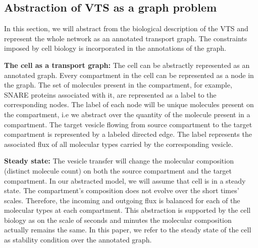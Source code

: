 \subsection{Abstraction of VTS as a graph problem}


In this section, we will abstract from the biological description of the VTS and represent the whole network as an annotated transport graph. 
%
The constraints imposed by cell biology is incorporated in the  annotations of the graph. 

\textbf{The cell as a transport graph:} 
The cell can be abstractly represented as an annotated graph. 
Every compartment in the cell can be represented as a node in the graph. 
%
The set of molecules present in the compartment, for example, SNARE proteins associated with it, are represented as a label to the corresponding nodes.
%
The label of each node will be unique molecules present on the compartment, i.e we abstract over the quantity of the molecule present in a compartment.
%
The target vesicle flowing from source compartment to the target compartment is represented by a labeled directed edge. 
% 
The label represents the associated flux of all molecular types carried by the corresponding vesicle.
%
%

\textbf{Steady state:} 
The vesicle transfer will change the molecular composition (distinct molecule count) on both the source compartment and the target compartment. 
%
In our abstracted model, we will assume that cell is in a steady state. 
%
The compartment's composition does not evolve over the short times' scales.
%
Therefore, the incoming and outgoing flux is balanced for each of the molecular types at each compartment.
%
This abstraction is supported by the cell biology as on the scale of seconds and minutes the molecular composition actually remains the same. 
%
In this paper, we refer to the steady state of the cell as stability condition over the annotated graph.



